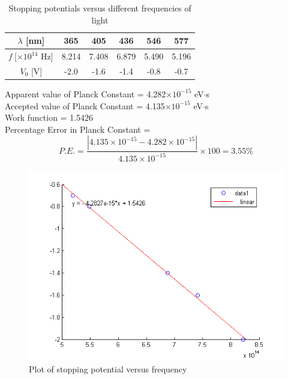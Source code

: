 \documentclass[a4paper,12pt]{article}
\begin{document}
\newpage
\begin{table}[h!]

\begin{center}
	\begin{tabular}{|c|c|c|c|c|c|}
	\hline $\lambda$ [nm] & 365 & 405 & 436 & 546 & 577 \\ 
	\hline \textit{f} [$\times 10^{14}$ Hz] & 8.214 & 7.408 & 6.879 & 5.490 & 5.196 \\ 
	\hline $V_{0}$ [V] & -2.0 & -1.6 & -1.4 & -0.8 & -0.7 \\ 
	\hline 
\end{tabular} 
\end{center}
\caption{Stopping potentials versus different frequencies of light}
\end{table}

Apparent value of Planck Constant = 4.282$\times 10^{-15}$ eV$\cdot$s\\
Accepted value of Planck Constant = 4.135$\times 10^{-15}$ eV$\cdot$s\\
Work function = 1.5426\\
Percentage Error in Planck Constant =
\begin{equation}
P.E. = \frac{|4.135\times 10^{-15}-4.282\times 10^{-15}|}{4.135\times 10^{-15}}\times100=3.55\%
\end{equation}
\begin{figure}[h!]
\centering
\includegraphics[scale = 0.7]{"plot plancks constant"}
\caption{Plot of stopping potential versus frequency }
\label{fig:plotplancksconstant}
\end{figure}
\end{document}
